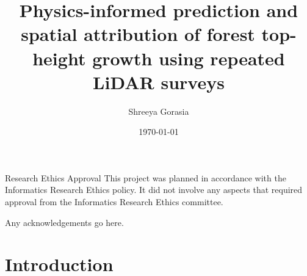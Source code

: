 \documentclass[logo,msc,ai]{infthesis}           %
\begin{document}
\begin{preliminary}

\title{Physics-informed prediction and spatial attribution of forest top-height growth using repeated LiDAR surveys}

\author{Shreeya Gorasia}

\date{\today}



\maketitle

\newenvironment{ethics}
   {\begin{frontenv}{Research Ethics Approval}{\LARGE}}
   {\end{frontenv}\newpage}

\begin{ethics}
This project was planned in accordance with the Informatics Research
Ethics policy. It did not involve any aspects that required approval
from the Informatics Research Ethics committee.

\standarddeclaration
\end{ethics}


\begin{acknowledgements}
Any acknowledgements go here.
\end{acknowledgements}


\tableofcontents
\end{preliminary}

\chapter{Introduction} \label{chap:introduction}
\end{document}
